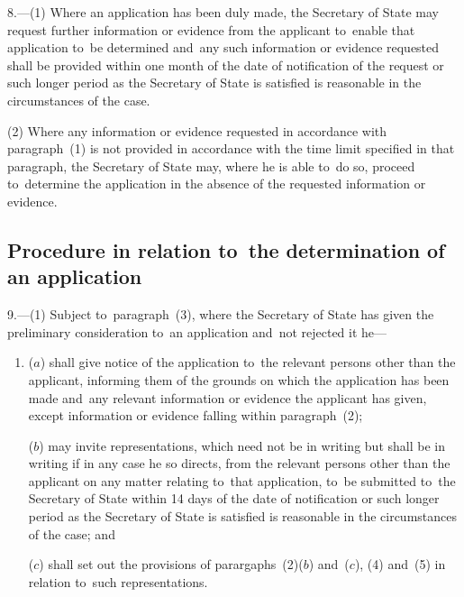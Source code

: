 \documentclass[12pt,a4paper]{article}
\begin{document}
8.---(1)  Where an application has been duly made, the Secretary of State may request further information or evidence from the applicant to~enable that application to~be determined and~any such information or evidence requested shall be provided within one month of the date of notification of the request or such longer period as the Secretary of State is satisfied is reasonable in the circumstances of the case.

(2) Where any information or evidence requested in accordance with paragraph~(1) is not provided in accordance with the time limit specified in that paragraph, the Secretary of State may, where he is able to~do so, proceed to~determine the application in the absence of the requested information or evidence.

\subsection[9. Procedure in relation to~the determination of an application]{Procedure in relation to~the determination of an application}

9.---(1)  Subject to~paragraph~(3), where the Secretary of State has given the preliminary consideration to~an application and~not rejected it he—
\begin{enumerate}\item[]
($a$) shall give notice of the application to~the relevant persons other than the applicant, informing them of the grounds on which the application has been made and~any relevant information or evidence the applicant has given, except information or evidence falling within paragraph~(2);

($b$) may invite representations, which need not be in writing but shall be in writing if in any case he so directs, from the relevant persons other than the applicant on any matter relating to~that application, to~be submitted to~the Secretary of State within 14 days of the date of notification or such longer period as the Secretary of State is satisfied is reasonable in the circumstances of the case; and

($c$) shall set out the provisions of parargaphs~(2)($b$)  and~($c$), (4) and~(5) in relation to~such representations.
\end{enumerate}
\end{document}
